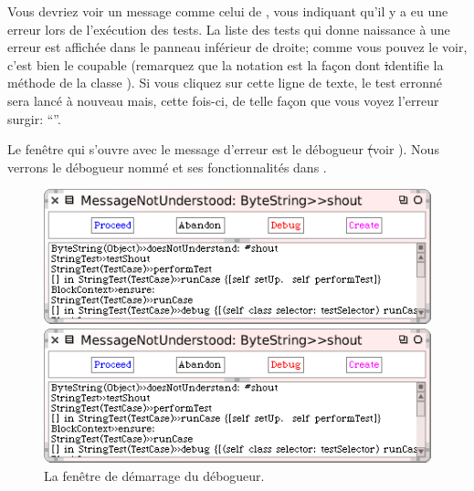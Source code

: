 \documentclass[a4paper,10pt,twoside]{book}
\begin{document}
Vous devriez voir un message comme celui de
, vous indiquant qu'il y a eu une erreur
lors de l'ex\'ecution des tests. La liste des tests qui donne
naissance \`a une erreur est affich\'ee dans le panneau inf\'erieur de
droite; comme vous pouvez le voir, c'est bien
 le coupable
(remarquez que la notation  est la fa\c{c}on dont \st
identifie la m\'ethode de la classe ).
Si vous cliquez sur cette ligne de texte, le test erronn\'e sera
lanc\'e \`a nouveau mais, cette fois-ci, de telle fa\c{c}on que vous
voyez l'erreur surgir:
``''.

Le fen\^etre qui s'ouvre avec le message d'erreur est le d\'ebogueur \st (voir ).
Nous verrons le d\'ebogueur nomm\'e  et ses
fonctionnalit\'es dans .

\begin{figure}[hbt]
\ifluluelse
	{\centerline {\includegraphics[width=\textwidth]{Predebugger}}}
	{\centerline {\includegraphics[scale=0.7]{Predebugger}}}
\caption{La fenêtre de démarrage du d\'ebogueur.}
\label{fig:predebugger}
\end{figure}
\end{document}
